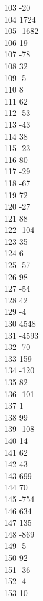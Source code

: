 { 103	-20 \\
 104	1724 \\
 105	-1682 \\
 106	19 \\
 107	-78 \\
 108	32 \\
 109	-5 \\
 110	8 \\
 111	62 \\
 112	-53 \\
 113	-43 \\
 114	38 \\
 115	-23 \\
 116	80 \\
 117	-29 \\
 118	-67 \\
 119	72 \\
 120	-27 \\
 121	88 \\
 122	-104 \\
 123	35 \\
 124	6 \\
 125	-57 \\
 126	98 \\
 127	-54 \\
 128	42 \\
 129	-4 \\
 130	4548 \\
 131	-4593 \\
 132	-70 \\
 133	159 \\
 134	-120 \\
 135	82 \\
 136	-101 \\
 137	1 \\
 138	99 \\
 139	-108 \\
 140	14 \\
 141	62 \\
 142	43 \\
 143	699 \\
 144	70 \\
 145	-754 \\
 146	634 \\
 147	135 \\
 148	-869 \\
 149	-5 \\
 150	92 \\
 151	-36 \\
 152	-4 \\
 153	10 \\
}
